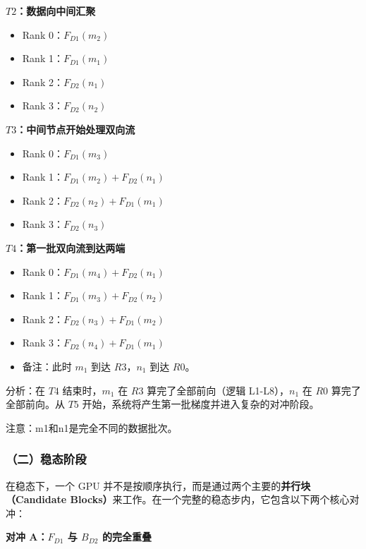 \textbf{\(T2\)：数据向中间汇聚}

\begin{itemize}
\tightlist
\item
  Rank 0：\(F_{D1}(m_2)\)
\item
  Rank 1：\(F_{D1}(m_1)\)
\item
  Rank 2：\(F_{D2}(n_1)\)
\item
  Rank 3：\(F_{D2}(n_2)\)
\end{itemize}

\textbf{\(T3\)：中间节点开始处理双向流}

\begin{itemize}
\tightlist
\item
  Rank 0：\(F_{D1}(m_3)\)
\item
  Rank 1：\(F_{D1}(m_2)+F_{D2}(n_1)\)
\item
  Rank 2：\(F_{D2}(n_2)+F_{D1}(m_1)\)
\item
  Rank 3：\(F_{D2}(n_3)\)
\end{itemize}

\textbf{\(T4\)：第一批双向流到达两端}

\begin{itemize}
\tightlist
\item
  Rank 0：\(F_{D1}(m_4)+F_{D2}(n_1)\)
\item
  Rank 1：\(F_{D1}(m_3)+F_{D2}(n_2)\)
\item
  Rank 2：\(F_{D2}(n_3)+F_{D1}(m_2)\)
\item
  Rank 3：\(F_{D2}(n_4)+F_{D1}(m_1)\)
\item
  备注：此时 \(m_1\) 到达 \(R3\)，\(n_1\) 到达 \(R0\)。
\end{itemize}

分析：在 \(T4\) 结束时，\(m_1\) 在 \(R3\) 算完了全部前向（逻辑 L1-L8），\(n_1\) 在 \(R0\) 算完了全部前向。从 \(T5\) 开始，系统将产生第一批梯度并进入复杂的对冲阶段。

注意：m1和n1是完全不同的数据批次。

\hypertarget{ux4e8cux7a33ux6001ux9636ux6bb5}{%
\subsubsection{（二）稳态阶段}\label{ux4e8cux7a33ux6001ux9636ux6bb5}}

在稳态下，一个 GPU 并不是按顺序执行，而是通过两个主要的\textbf{并行块（Candidate Blocks）}来工作。在一个完整的稳态步内，它包含以下两个核心对冲：

\textbf{对冲 A：\(F_{D1}\) 与 \(B_{D2}\) 的完全重叠}


